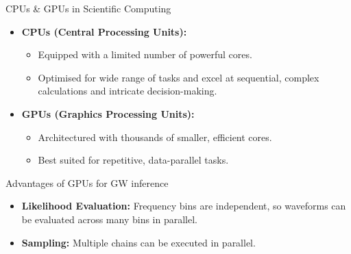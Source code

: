 \documentclass[aspectratio=169, 11pt]{beamer}
\def \bblock{\begin{beamerboxesrounded}[upper=uppercolor,lower=lowercolor,shadow=true]}
\def \eblock{\end{beamerboxesrounded}}
\begin{document}
\begin{frame}{CPUs \& GPUs in Scientific Computing}
\vfill
  \begin{itemize}
    \item \textbf{CPUs (Central Processing Units):}
      \begin{itemize}
        \item Equipped with a limited number of powerful cores.
        \item Optimised for wide range of tasks and excel at sequential, complex calculations and intricate decision-making.
      \end{itemize}
      
    \item \textbf{GPUs (Graphics Processing Units):}
      \begin{itemize}
        \item Architectured with thousands of smaller, efficient cores.
        \item Best suited for repetitive, data-parallel tasks.
      \end{itemize}
  \end{itemize}
\vfill
\bblock{ \centering Advantages of GPUs for GW inference}
\begin{itemize}
\item \textbf{Likelihood Evaluation:} 
 Frequency bins are independent, so waveforms can be evaluated across many bins in parallel.
        \item \textbf{Sampling:}  
         Multiple chains can be executed in parallel.
      \end{itemize}
\eblock
          
\end{frame}
\end{document}
